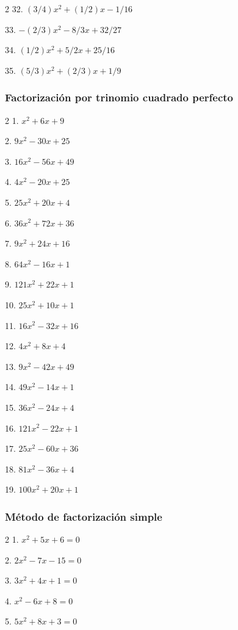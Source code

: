 \documentclass[12pt]{article}
\begin{document}
{\begin{multicols}{2}
32. $(3/4)x^2 + (1/2)x - 1/16$

33. $-(2/3)x^2 - 8/3x + 32/27$

34. $(1/2)x^2 + 5/2x + 25/16$

35. $(5/3)x^2 + (2/3)x + 1/9$
\end{multicols}

\subsubsection{Factorización por trinomio cuadrado perfecto}

\label{factorizaciuxf3n-por-trinomio-cuadrado-perfecto}
\begin{multicols}{2}
1. $x^2 + 6x + 9$

2. $9x^2 - 30x + 25$

3. $16x^2 - 56x + 49$

4. $4x^2 - 20x + 25$

5. $25x^2 + 20x + 4$

6. $36x^2 + 72x + 36$

7. $9x^2 + 24x + 16$

8. $64x^2 - 16x + 1$

9. $121x^2 + 22x + 1$

10. $25x^2 + 10x + 1$

11. $16x^2 - 32x + 16$

12. $4x^2 + 8x + 4$

13. $9x^2 - 42x + 49$

14. $49x^2 - 14x + 1$

15. $36x^2 - 24x + 4$

16. $121x^2 - 22x + 1$

17. $25x^2 - 60x + 36$

18. $81x^2 - 36x + 4$

19. $100x^2 + 20x + 1$

\end{multicols}


\subsubsection{Método de factorización simple}\label{muxe9todo-de-factorizaciuxf3n-simple}
\begin{multicols}{2}
1. $x^2 + 5x + 6 = 0$

2. $2x^2 - 7x - 15 = 0$

3. $3x^2 + 4x + 1 = 0$

4. $x^2 - 6x + 8 = 0$

5. $5x^2 + 8x + 3 = 0$


\end{multicols}}
\end{document}
